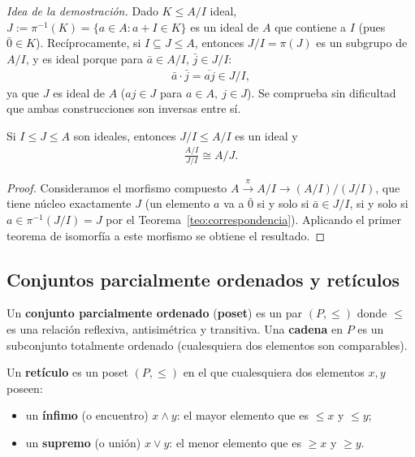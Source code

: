 \emph{Idea de la demostración.} Dado $K\leq A/I$ ideal, $J:=\pi^{-1}(K)=\{a\in A : a+I\in K\}$ es un ideal de $A$ que contiene a $I$ (pues $\bar 0 \in K$). Recíprocamente, si $I\subseteq J\leq A$, entonces $J/I=\pi(J)$ es un subgrupo de $A/I$, y es ideal porque para $\bar a\in A/I$, $\bar j\in J/I$:
\begin{gather*}
    \bar a \cdot \bar j = \overline{aj} \in J/I,
\end{gather*}
ya que $J$ es ideal de $A$ ($aj\in J$ para $a\in A,\ j\in J$). Se comprueba sin dificultad que ambas construcciones son inversas entre sí.

\begin{teo}\label{teo:tercer-isomorfia}
Si $I\leq J \leq A$ son ideales, entonces $J/I \leq A/I$ es un ideal y
\begin{gather*}
    \frac{A/I}{J/I} \cong A/J.
\end{gather*}
\end{teo}
\begin{proof}
Consideramos el morfismo compuesto $A \xrightarrow{\pi} A/I \to (A/I)/(J/I)$, que tiene núcleo exactamente $J$ (un elemento $a$ va a $\bar 0$ si y solo si $\bar a \in J/I$, si y solo si $a\in \pi^{-1}(J/I)=J$ por el Teorema~\ref{teo:correspondencia}). Aplicando el primer teorema de isomorfía a este morfismo se obtiene el resultado.
\end{proof}

\subsection{Conjuntos parcialmente ordenados y retículos}

\begin{definicion}
Un \textbf{conjunto parcialmente ordenado} (\textbf{poset}) es un par $(P,\leq)$ donde $\leq$ es una relación reflexiva, antisimétrica y transitiva. Una \textbf{cadena} en $P$ es un subconjunto totalmente ordenado (cualesquiera dos elementos son comparables).
\end{definicion}

\begin{definicion}
Un \textbf{retículo} es un poset $(P,\leq)$ en el que cualesquiera dos elementos $x,y$ poseen:
\begin{itemize}
    \item un \textbf{ínfimo} (o encuentro) $x\wedge y$: el mayor elemento que es $\leq x$ y $\leq y$;
    \item un \textbf{supremo} (o unión) $x\vee y$: el menor elemento que es $\geq x$ y $\geq y$.
\end{itemize}
\end{definicion}

